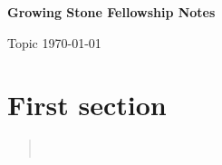 \documentclass[12pt]{article}
\begin{document}
	\noindent
	\textbf{Growing Stone Fellowship \hfill Notes}

	\noindent
	Topic \hfill \today
	
	\section*{\normalsize First section}

	\begin{quote}
		\BibleJohnThreeSixteen{} \\
		\BibleJohnThreeSeventeen{}
	\end{quote}
\end{document}
